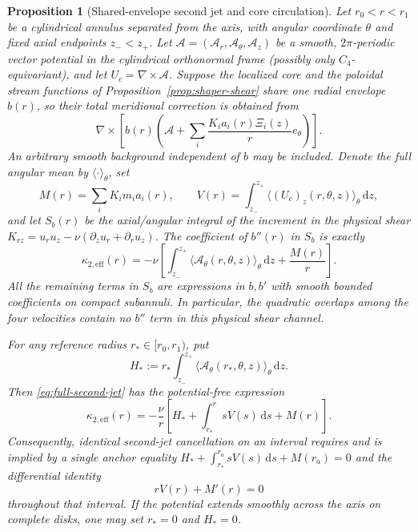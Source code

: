 \documentclass[11pt,a4paper]{article}
\theoremstyle{plain}
\newtheorem{proposition}[theorem]{Proposition}
\theoremstyle{definition}
\newcommand{\dd}{\,\mathrm{d}}
\begin{document}
\begin{proposition}[Shared-envelope second jet and core circulation]
\label{prop:shared-envelope}
Let $r_0<r<r_1$ be a cylindrical annulus separated from the axis,
with angular coordinate $\theta$ and fixed axial endpoints $z_-<z_+$.
Let $\mathcal A=(\mathcal A_r,\mathcal A_\theta,\mathcal A_z)$ be a smooth,
$2\pi$-periodic vector potential in the cylindrical orthonormal frame
(possibly only $C_4$-equivariant), and let
$U_c=\nabla\times\mathcal A$. Suppose the localized core and the
poloidal stream functions of Proposition~\ref{prop:shaper-shear}
share one radial envelope $b(r)$, so their total meridional
correction is obtained from
\[
 \nabla\times\left[b(r)
 \left(\mathcal A+
    \sum_i\frac{K_ia_i(r)\Xi_i(z)}{r}e_\theta\right)\right].
\]
An arbitrary smooth background independent of $b$ may be included.
Denote the full angular mean by $\langle\cdot\rangle_\theta$, set
\[
 M(r)=\sum_iK_i m_i a_i(r),\qquad
 V(r)=\int_{z_-}^{z_+}\langle (U_c)_z(r,\theta,z)
                  \rangle_\theta\dd z ,
\]
and let $S_b(r)$ be the axial/angular integral of the increment in the
physical shear
$K_{rz}=u_ru_z-\nu(\partial_zu_r+\partial_ru_z)$.
The coefficient of $b''(r)$ in $S_b$ is exactly
\begin{equation}\label{eq:full-second-jet}
 \kappa_{2,\mathrm{eff}}(r)=
 -\nu\left[\int_{z_-}^{z_+}
      \langle\mathcal A_\theta(r,\theta,z)\rangle_\theta\dd z
         +\frac{M(r)}r\right].
\end{equation}
All the remaining terms in $S_b$ are expressions in $b,b'$
with smooth bounded coefficients on compact subannuli. In particular,
the quadratic overlaps among the four velocities contain no
$b''$ term in this \emph{physical shear} channel.

For any reference radius $r_*\in[r_0,r_1)$, put
\[
 H_*:=r_*\int_{z_-}^{z_+}
     \langle\mathcal A_\theta(r_*,\theta,z)\rangle_\theta\dd z.
\]
Then \eqref{eq:full-second-jet} has the potential-free expression
\begin{equation}\label{eq:circulation-second-jet}
 \kappa_{2,\mathrm{eff}}(r)=
 -\frac{\nu}{r}
 \left[H_*+\int_{r_*}^r sV(s)\dd s+M(r)\right].
\end{equation}
Consequently, \emph{identical} second-jet cancellation on an interval
requires and is implied by a single anchor equality
$H_*+\int_{r_*}^{r_a}sV(s)\dd s+M(r_a)=0$
and the differential identity
\begin{equation}\label{eq:circulation-cancellation}
 rV(r)+M'(r)=0
\end{equation}
throughout that interval. If the potential extends smoothly across
the axis on complete disks, one may set $r_*=0$ and $H_*=0$.
\end{proposition}
\end{document}
